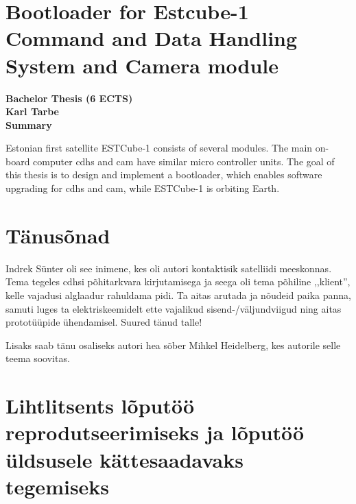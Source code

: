 \documentclass[12pt,a4paper]{article}
\begin{document}
\section*{Bootloader for Estcube-1 Command and Data Handling System and Camera module}
\begin{center}
\bf Bachelor Thesis (6 ECTS)\\
Karl Tarbe\\
Summary
\end{center}
\glsresetall
Estonian first satellite ESTCube-1 consists of several modules. The main
on-board computer \Gls{cdhs} and \gls{cam} have similar micro controller units.
The goal of this thesis is to design and implement a bootloader, which enables
software upgrading for \gls{cdhs} and \gls{cam}, while ESTCube-1 is orbiting
Earth.

\section*{Tänusõnad}
Indrek Sünter oli see inimene, kes oli autori kontaktisik satelliidi meeskonnas.
Tema tegeles \gls{cdhs}i põhitarkvara kirjutamisega ja seega oli tema põhiline
,,klient'', kelle vajadusi alglaadur rahuldama pidi. Ta aitas arutada ja nõudeid
paika panna, samuti luges ta elektriskeemidelt ette vajalikud
sisend-/väljundviigud ning aitas prototüüpide ühendamisel. Suured tänud talle!

Lisaks saab tänu osaliseks autori hea sõber Mihkel Heidelberg, kes autorile selle
teema soovitas.

\label{viited}



\pagebreak
\section*{Lihtlitsents lõputöö reprodutseerimiseks ja lõputöö üldsusele
kättesaadavaks tegemiseks}
\end{document}
